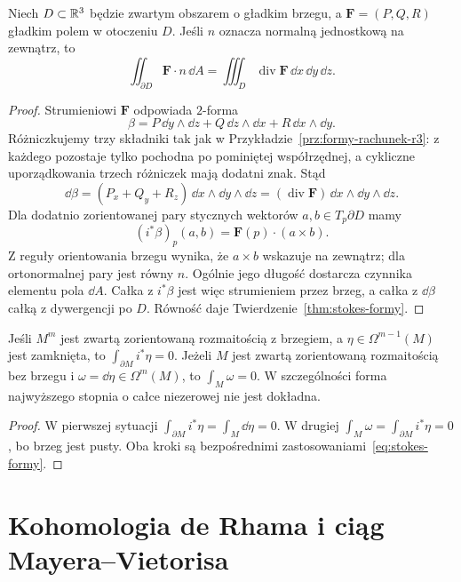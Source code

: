 \begin{wniosek}
\label{cor:stokes-gauss}
Niech $D\subset\mathbb{R}^3$ będzie zwartym obszarem
o gładkim brzegu, a $\mathbf F=(P,Q,R)$
gładkim polem w otoczeniu $D$.
Jeśli $n$ oznacza normalną jednostkową
na zewnątrz, to
\[
 \iint_{\partial D}\mathbf F\cdot n\,\dd A
 =\iiint_D\operatorname{div}\mathbf F\,
                  \dd x\,\dd y\,\dd z.
\]
\end{wniosek}
\begin{proof}
Strumieniowi $\mathbf F$ odpowiada $2$-forma
\[
 \beta=P\,\dd y\wedge\dd z
      +Q\,\dd z\wedge\dd x
      +R\,\dd x\wedge\dd y.
\]
Różniczkujemy trzy składniki tak jak w
Przykładzie~\ref{prz:formy-rachunek-r3}:
z każdego pozostaje tylko pochodna po pominiętej współrzędnej,
a cykliczne uporządkowania trzech różniczek mają dodatni znak.
Stąd
\[
 \dd\beta=(P_x+Q_y+R_z)\,
           \dd x\wedge\dd y\wedge\dd z
          =(\operatorname{div}\mathbf F)\,
           \dd x\wedge\dd y\wedge\dd z.
\]
Dla dodatnio zorientowanej pary stycznych
wektorów $a,b\in T_p\partial D$ mamy
\[
 (i^*\beta)_p(a,b)
 =\mathbf F(p)\cdot(a\times b).
\]
Z reguły orientowania brzegu wynika, że
$a\times b$ wskazuje na zewnątrz; dla
ortonormalnej pary jest równy $n$.
Ogólnie jego długość dostarcza czynnika
elementu pola $\dd A$. Całka z $i^*\beta$
jest więc strumieniem przez brzeg, a całka
z $\dd\beta$ całką z dywergencji po $D$.
Równość daje Twierdzenie~\ref{thm:stokes-formy}.
\end{proof}

\begin{wniosek}
\label{cor:stokes-top-form}
Jeśli $M^m$ jest zwartą zorientowaną rozmaitością
z brzegiem, a $\eta\in\Omega^{m-1}(M)$ jest
zamknięta, to $\int_{\partial M}i^*\eta=0$.
Jeżeli $M$ jest zwartą zorientowaną rozmaitością
bez brzegu i $\omega=\dd\eta\in\Omega^m(M)$,
to $\int_M\omega=0$. W szczególności forma
najwyższego stopnia o całce niezerowej nie jest
dokładna.
\end{wniosek}
\begin{proof}
W pierwszej sytuacji
$\int_{\partial M}i^*\eta=\int_M\dd\eta=0$.
W drugiej
$\int_M\omega=\int_{\partial M}i^*\eta=0$,
bo brzeg jest pusty. Oba kroki są
bezpośrednimi zastosowaniami~\eqref{eq:stokes-formy}.
\end{proof}
\section{Kohomologia de Rhama i ciąg Mayera--Vietorisa}
\label{sec:de-rham-mv}

